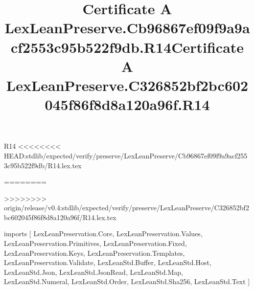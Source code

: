 \begin{lexlean}{R14}
<<<<<<<< HEAD:stdlib/expected/verify/preserve/LexLeanPreserve/Cb96867ef09f9a9acf2553c95b522f9db/R14.lex.tex
\title{Certificate A LexLeanPreserve.Cb96867ef09f9a9acf2553c95b522f9db.R14}
========
\title{Certificate A LexLeanPreserve.C326852bf2bc602045f86f8d8a120a96f.R14}
>>>>>>>> origin/release/v0.4:stdlib/expected/verify/preserve/LexLeanPreserve/C326852bf2bc602045f86f8d8a120a96f/R14.lex.tex
\begin{coremodule}
imports [
  LexLeanPreservation.Core,
  LexLeanPreservation.Values,
  LexLeanPreservation.Primitives,
  LexLeanPreservation.Fixed,
  LexLeanPreservation.Keys,
  LexLeanPreservation.Templates,
  LexLeanPreservation.Validate,
  LexLeanStd.Buffer,
  LexLeanStd.Host,
  LexLeanStd.Json,
  LexLeanStd.JsonRead,
  LexLeanStd.Map,
  LexLeanStd.Numeral,
  LexLeanStd.Order,
  LexLeanStd.Sha256,
  LexLeanStd.Text
]


\end{coremodule}
\end{lexlean}
